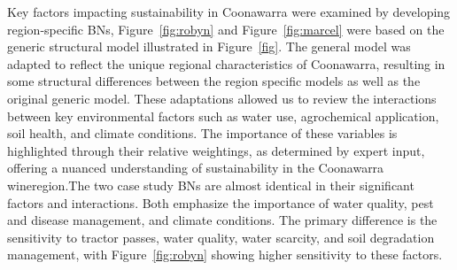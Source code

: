 \documentclass[fleqn,10pt]{wlscirep}
\begin{document}
Key factors impacting sustainability in Coonawarra were examined by developing region-specific BNs, Figure~\ref{fig:robyn} and Figure~\ref{fig:marcel} were based on the generic structural model illustrated in Figure~\ref{fig}. The general model was adapted to reflect the unique regional characteristics of Coonawarra, resulting in some structural differences between the region specific models as well as the original generic model. These adaptations allowed us to review the interactions between key environmental factors such as water use, agrochemical application, soil health, and climate conditions. The importance of these variables is highlighted through their relative weightings, as determined by expert input, offering a nuanced understanding of sustainability in the Coonawarra wineregion.The two case study BNs are almost identical in their significant factors and interactions. Both emphasize the importance of water quality, pest and disease management, and climate conditions. The primary difference is the sensitivity to tractor passes, water quality, water scarcity, and soil degradation management, with Figure~\ref{fig:robyn} showing higher sensitivity to these factors. 


\end{document}
